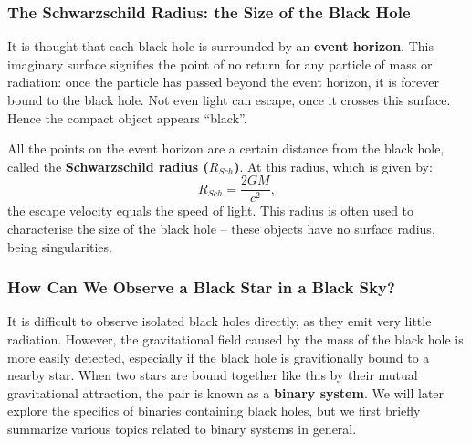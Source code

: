 
\subsubsection{The Schwarzschild Radius: the Size of the Black Hole}
\label{cha:Introduction:sec:BlackHoles:subsubsec:EventHorizon}

It is thought that each black hole is surrounded by an \textbf{event
horizon}. This imaginary surface signifies the point of no return for any particle of mass
or radiation: once the particle has passed beyond the event horizon,
it is forever bound to the black hole. Not even light can escape, once it crosses this surface. Hence the compact object appears ``black''. %

\vspace{\myparskip}

All the points on the event horizon are a certain distance from the black hole, called the
\textbf{Schwarzschild radius ($R_{Sch}$)}. %
At this radius, which is given by:
\begin{equation} 
\label{cha:Introduction:sec:BlackHoles:eqn:R_Sch}
R_{Sch} = \frac{2 G M}{c^2},
\end{equation}
the escape velocity equals the speed of light. This radius is often used to characterise the size of the black hole -- these objects have no surface radius, being singularities. %


\subsubsection{How Can We Observe a Black Star in a Black Sky?}
\label{cha:Introduction:sec:BlackHoles:subsubsec:HowCanWeObserveABlackStarInABlackSky}

It is difficult to observe isolated black holes directly, as they emit
very little radiation. However, the gravitational field caused by the mass of
the black hole is more easily detected, especially if the black hole
is gravitionally bound to a nearby star. When two stars are bound
together like this by their mutual gravitational attraction, the pair is known
as a \textbf{binary system}. We will later explore the specifics of
binaries containing black holes, but we first briefly summarize various topics
related to binary systems in general. %

